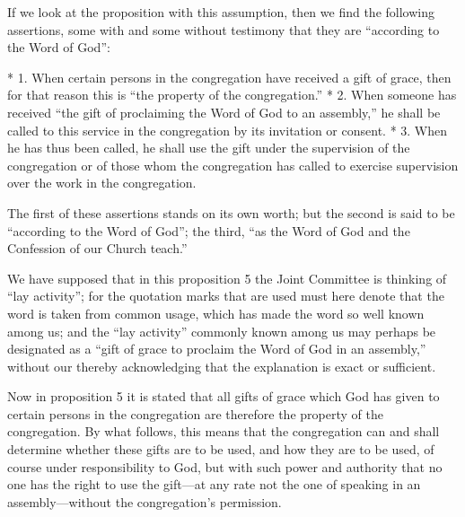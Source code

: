 If we look at the proposition with this assumption, then we find the following assertions, some with and some without testimony that they are “according to the Word of God”:

* 1. When certain persons in the congregation have received a gift of grace, then for that reason this is “the property of the congregation.”
* 2. When someone has received “the gift of proclaiming the Word of God to an assembly,” he shall be called to this service in the congregation by its invitation or consent.
* 3. When he has thus been called, he shall use the gift under the supervision of the congregation or of those whom the congregation has called to exercise supervision over the work in the congregation.

The first of these assertions stands on its own worth; but the second is said to be “according to the Word of God”; the third, “as the Word of God and the Confession of our Church teach.”

We have supposed that in this proposition 5 the Joint Committee is thinking of “lay activity”; for the quotation marks that are used must here denote that the word is taken from common usage, which has made the word so well known among us; and the “lay activity” commonly known among us may perhaps be designated as a “gift of grace to proclaim the Word of God in an assembly,” without our thereby acknowledging that the explanation is exact or sufficient.

Now in proposition 5 it is stated that all gifts of grace which God has given to certain persons in the congregation are therefore the property of the congregation. By what follows, this means that the congregation can and shall determine whether these gifts are to be used, and how they are to be used, of course under responsibility to God, but with such power and authority that no one has the right to use the gift—at any rate not the one of speaking in an assembly—without the congregation’s permission.

